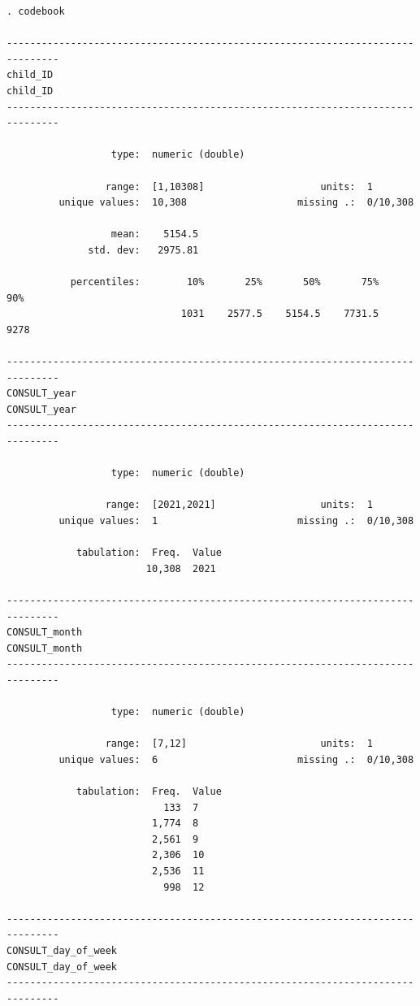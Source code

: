 \documentclass[
  letterpaper,
  DIV=11,
  numbers=noendperiod]{scrreprt}
\begin{document}
\begin{verbatim}
. codebook

-------------------------------------------------------------------------------
child_ID                                                               child_ID
-------------------------------------------------------------------------------

                  type:  numeric (double)

                 range:  [1,10308]                    units:  1
         unique values:  10,308                   missing .:  0/10,308

                  mean:    5154.5
              std. dev:   2975.81

           percentiles:        10%       25%       50%       75%       90%
                              1031    2577.5    5154.5    7731.5      9278

-------------------------------------------------------------------------------
CONSULT_year                                                       CONSULT_year
-------------------------------------------------------------------------------

                  type:  numeric (double)

                 range:  [2021,2021]                  units:  1
         unique values:  1                        missing .:  0/10,308

            tabulation:  Freq.  Value
                        10,308  2021

-------------------------------------------------------------------------------
CONSULT_month                                                     CONSULT_month
-------------------------------------------------------------------------------

                  type:  numeric (double)

                 range:  [7,12]                       units:  1
         unique values:  6                        missing .:  0/10,308

            tabulation:  Freq.  Value
                           133  7
                         1,774  8
                         2,561  9
                         2,306  10
                         2,536  11
                           998  12

-------------------------------------------------------------------------------
CONSULT_day_of_week                                         CONSULT_day_of_week
-------------------------------------------------------------------------------


\end{verbatim}
\end{document}
